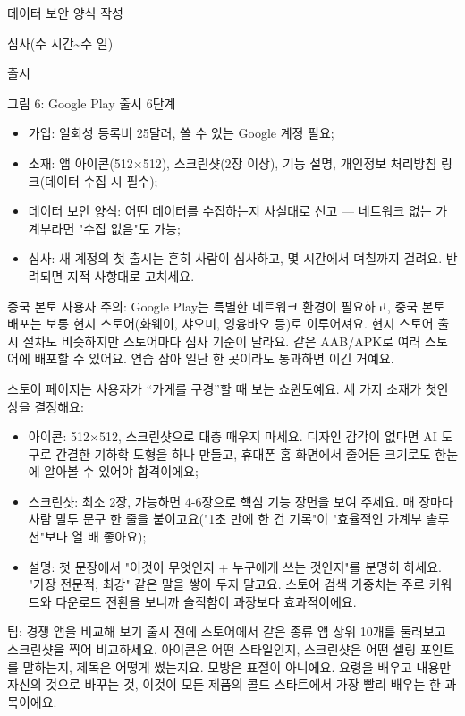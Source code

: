데이터 보안 양식 작성

심사(수 시간\textasciitilde{}수 일)

출시

\begin{center}\small\color{gray}그림 6: Google Play 출시 6단계\end{center}

\begin{itemize}
  \item 가입: 일회성 등록비 25달러, 쓸 수 있는 Google 계정 필요;
  \item 소재: 앱 아이콘(512×512), 스크린샷(2장 이상), 기능 설명, 개인정보 처리방침 링크(데이터 수집 시 필수);
  \item 데이터 보안 양식: 어떤 데이터를 수집하는지 사실대로 신고 — 네트워크 없는 가계부라면 "수집 없음"도 가능;
  \item 심사: 새 계정의 첫 출시는 흔히 사람이 심사하고, 몇 시간에서 며칠까지 걸려요. 반려되면 지적 사항대로 고치세요.
\end{itemize}

중국 본토 사용자 주의: Google Play는 특별한 네트워크 환경이 필요하고, 중국 본토 배포는 보통 현지 스토어(화웨이, 샤오미, 잉융바오 등)로 이루어져요. 현지 스토어 출시 절차도 비슷하지만 스토어마다 심사 기준이 달라요. 같은 AAB/APK로 여러 스토어에 배포할 수 있어요. 연습 삼아 일단 한 곳이라도 통과하면 이긴 거예요.


스토어 페이지는 사용자가 “가게를 구경”할 때 보는 쇼윈도예요. 세 가지 소재가 첫인상을 결정해요:

\begin{itemize}
  \item 아이콘: 512×512, 스크린샷으로 대충 때우지 마세요. 디자인 감각이 없다면 AI 도구로 간결한 기하학 도형을 하나 만들고, 휴대폰 홈 화면에서 줄어든 크기로도 한눈에 알아볼 수 있어야 합격이에요;
  \item 스크린샷: 최소 2장, 가능하면 4-6장으로 핵심 기능 장면을 보여 주세요. 매 장마다 사람 말투 문구 한 줄을 붙이고요("1초 만에 한 건 기록"이 "효율적인 가계부 솔루션"보다 열 배 좋아요);
  \item 설명: 첫 문장에서 "이것이 무엇인지 + 누구에게 쓰는 것인지"를 분명히 하세요. "가장 전문적, 최강" 같은 말을 쌓아 두지 말고요. 스토어 검색 가중치는 주로 키워드와 다운로드 전환을 보니까 솔직함이 과장보다 효과적이에요.
\end{itemize}

\begin{tcbinfo}{팁: 경쟁 앱을 비교해 보기}
출시 전에 스토어에서 같은 종류 앱 상위 10개를 둘러보고 스크린샷을 찍어 비교하세요. 아이콘은 어떤 스타일인지, 스크린샷은 어떤 셀링 포인트를 말하는지, 제목은 어떻게 썼는지요. 모방은 표절이 아니에요. 요령을 배우고 내용만 자신의 것으로 바꾸는 것, 이것이 모든 제품의 콜드 스타트에서 가장 빨리 배우는 한 과목이에요.

\end{tcbinfo}

